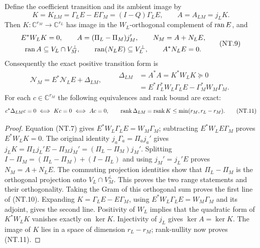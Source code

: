 \begin{theorem}
Define the coefficient transition and its ambient image by
\[
 K=K_{LM}=\Gamma_LE-E\Gamma_M=(I-Q)\Gamma_LE,
 \qquad A=A_{LM}=j_LK.
 \tag{NT.8}
\]
Then $K:\mathbb C^{r_M}\to\mathbb C^{r_L}$ has image in
the $W_L$-orthogonal complement of $\operatorname{ran} E$, and
\[
 \begin{gathered}
 E^*W_LK=0,\qquad
 A=(\Pi_L-\Pi_M)j_M',\qquad
 N_M=A+N_LE,\\
 \operatorname{ran} A\subseteq V_L\cap V_M^\perp,\qquad
 \operatorname{ran}(N_LE)\subseteq V_L^\perp,\qquad A^*N_LE=0.
 \end{gathered}
 \tag{NT.9}
\]
Consequently the exact positive transition form is
\[
 \boxed{\mathcal N_M=E^*\mathcal N_LE+\Delta_{LM}},\qquad
 \begin{aligned}
 \Delta_{LM}&=A^*A=K^*W_LK\succeq0\\
 &=E^*\Gamma_L^*W_L\Gamma_LE
                           -\Gamma_M^*W_M\Gamma_M.
 \end{aligned}
 \tag{NT.10}
\]
For each $c\in\mathbb C^{r_M}$ the following equivalences and
rank bound are exact:
\[
 c^*\Delta_{LM}c=0\ \Longleftrightarrow\ Kc=0
 \ \Longleftrightarrow\ Ac=0,\qquad
 \operatorname{rank}\Delta_{LM}=\operatorname{rank} K\le\min(r_M,r_L-r_M).
 \tag{NT.11}
\]
\end{theorem}

\begin{proof}
Equation (NT.7) gives $E^*W_L\Gamma_LE=W_M\Gamma_M$;
subtracting $E^*W_LE\Gamma_M$ proves $E^*W_LK=0$.
The original identity $j_a\Gamma_a=\Pi_a j_a'$ gives
$j_LK=\Pi_Lj_L'E-\Pi_Mj_M'=(\Pi_L-\Pi_M)j_M'$.
Splitting $I-\Pi_M=(\Pi_L-\Pi_M)+(I-\Pi_L)$ and using
$j_M'=j_L'E$ proves $N_M=A+N_LE$.
The commuting projection identities show that $\Pi_L-\Pi_M$
is the orthogonal projection onto $V_L\cap V_M^\perp$.
This proves the two range statements and their orthogonality.
Taking the Gram of this orthogonal sum proves the first line of
(NT.10). Expanding $K=\Gamma_LE-E\Gamma_M$, using
$E^*W_L\Gamma_LE=W_M\Gamma_M$ and its adjoint, gives
the second line. Positivity of $W_L$ implies that the quadratic
form of $K^*W_LK$ vanishes exactly on $\ker K$.
Injectivity of $j_L$ gives $\ker A=\ker K$.
The image of $K$ lies in a space of dimension $r_L-r_M$;
rank-nullity now proves (NT.11).
\end{proof}

